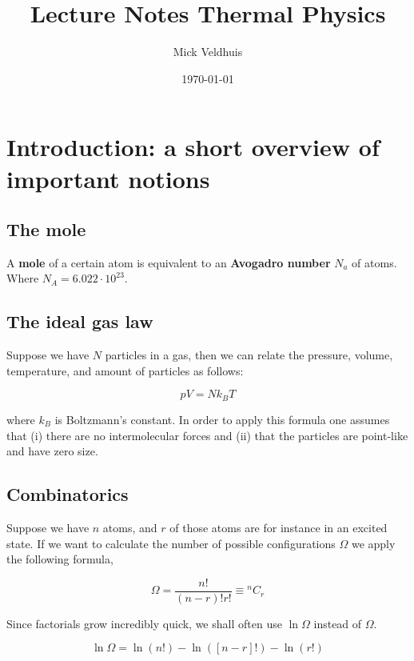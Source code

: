\documentclass[a4paper]{article}
\title{Lecture Notes Thermal Physics}
\author{Mick Veldhuis}
\date{\today}
\begin{document}
\maketitle

\tableofcontents

\section{Introduction: a short overview of important notions}

\subsection*{The mole}

A \textbf{mole} of a certain atom is equivalent to an \textbf{Avogadro number} $N_a$ of atoms. Where $N_A=6.022\cdot 10^23$.

\subsection*{The ideal gas law}

Suppose we have $N$ particles in a gas, then we can relate the pressure, volume, temperature, and amount of particles as follows:

\begin{equation}
	pV=Nk_BT
\end{equation}

where $k_B$ is Boltzmann's constant. In order to apply this formula one assumes that (i) there are no intermolecular forces and (ii) that the particles are point-like and have zero size. 

\subsection*{Combinatorics}

Suppose we have $n$ atoms, and $r$ of those atoms are for instance in an excited state. If we want to calculate the number of possible configurations $\Omega$ we apply the following formula,

\begin{equation}
	\Omega=\frac{n!}{(n-r)!r!}\equiv {}^nC_r
\end{equation}

Since factorials grow incredibly quick, we shall often use $\ln\Omega$ instead of $\Omega$. 

\begin{equation}
	\ln\Omega=\ln(n!)-\ln([n-r]!)-\ln(r!)
\end{equation}
\end{document}
